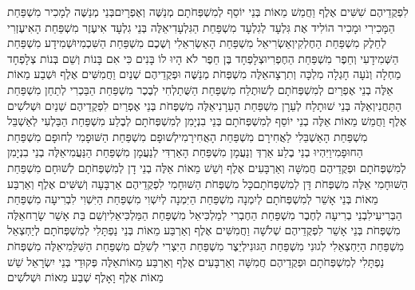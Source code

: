 \documentclass[../main/main.tex]{subfiles}
\begin{document}
\begin{multicols}{\ncols}
לִפְקֻדֵיהֶם שִׁשִּׁים אֶלֶף וַחֲמֵשׁ מֵאוֹת \ClosedSection{}בְּנֵי יוֹסֵף לְמִשְׁפְּחֹתָם מְנַשֶּׁה וְאֶפְרָיִם\PreVerseSpace{}בְּנֵי מְנַשֶּׁה לְמָכִיר מִשְׁפַּחַת הַמָּכִירִי וּמָכִיר הוֹלִיד אֶת גִּלְעָד לְגִלְעָד מִשְׁפַּחַת הַגִּלְעָדִי\PreVerseSpace{}אֵלֶּה בְּנֵי גִלְעָד אִיעֶזֶר מִשְׁפַּחַת הָאִיעֶזְרִי לְחֵלֶק מִשְׁפַּחַת הַחֶלְקִי\PreVerseSpace{}וְאַשְׂרִיאֵל מִשְׁפַּחַת הָאַשְׂרִאֵלִי וְשֶׁכֶם מִשְׁפַּחַת הַשִּׁכְמִי\PreVerseSpace{}וּשְׁמִידָע מִשְׁפַּחַת הַשְּׁמִידָעִי וְחֵפֶר מִשְׁפַּחַת הַחֶפְרִי\PreVerseSpace{}וּצְלָפְחָד בֶּן חֵפֶר לֹא הָיוּ לוֹ בָּנִים כִּי אִם בָּנוֹת וְשֵׁם בְּנוֹת צְלָפְחָד מַחְלָה וְנֹעָה חָגְלָה מִלְכָּה וְתִרְצָה\PreVerseSpace{}אֵלֶּה מִשְׁפְּחֹת מְנַשֶּׁה וּפְקֻדֵיהֶם שְׁנַיִם וַחֲמִשִּׁים אֶלֶף וּשְׁבַע מֵאוֹת \ClosedSection{}אֵלֶּה בְנֵי אֶפְרַיִם לְמִשְׁפְּחֹתָם לְשׁוּתֶלַח מִשְׁפַּחַת הַשֻּׁתַלְחִי לְבֶכֶר מִשְׁפַּחַת הַבַּכְרִי לְתַחַן מִשְׁפַּחַת הַתַּחֲנִי\PreVerseSpace{}וְאֵלֶּה בְּנֵי שׁוּתָלַח לְעֵרָן מִשְׁפַּחַת הָעֵרָנִי\PreVerseSpace{}אֵלֶּה מִשְׁפְּחֹת בְּנֵי אֶפְרַיִם לִפְקֻדֵיהֶם שְׁנַיִם וּשְׁלֹשִׁים אֶלֶף וַחֲמֵשׁ מֵאוֹת אֵלֶּה בְנֵי יוֹסֵף לְמִשְׁפְּחֹתָם \ClosedSection{}בְּנֵי בִנְיָמִן לְמִשְׁפְּחֹתָם לְבֶלַע מִשְׁפַּחַת הַבַּלְעִי לְאַשְׁבֵּל מִשְׁפַּחַת הָאַשְׁבֵּלִי לַאֲחִירָם מִשְׁפַּחַת הָאֲחִירָמִי\PreVerseSpace{}לְשׁוּפָם\SubEnd{} מִשְׁפַּחַת הַשּׁוּפָמִי לְחוּפָם מִשְׁפַּחַת הַחוּפָמִי\PreVerseSpace{}וַיִּהְיוּ בְנֵי בֶלַע אַרְדְּ וְנַעֲמָן מִשְׁפַּחַת הָאַרְדִּי לְנַעֲמָן מִשְׁפַּחַת הַנַּעֲמִי\PreVerseSpace{}אֵלֶּה בְנֵי בִנְיָמִן לְמִשְׁפְּחֹתָם וּפְקֻדֵיהֶם חֲמִשָּׁה וְאַרְבָּעִים אֶלֶף וְשֵׁשׁ מֵאוֹת \ClosedSection{}אֵלֶּה בְנֵי דָן לְמִשְׁפְּחֹתָם לְשׁוּחָם מִשְׁפַּחַת הַשּׁוּחָמִי אֵלֶּה מִשְׁפְּחֹת דָּן לְמִשְׁפְּחֹתָם\PreVerseSpace{}כָּל מִשְׁפְּחֹת הַשּׁוּחָמִי לִפְקֻדֵיהֶם אַרְבָּעָה וְשִׁשִּׁים אֶלֶף וְאַרְבַּע מֵאוֹת \ClosedSection{}בְּנֵי אָשֵׁר לְמִשְׁפְּחֹתָם לְיִמְנָה מִשְׁפַּחַת הַיִּמְנָה לְיִשְׁוִי מִשְׁפַּחַת הַיִּשְׁוִי לִבְרִיעָה מִשְׁפַּחַת הַבְּרִיעִי\PreVerseSpace{}לִבְנֵי בְרִיעָה לְחֶבֶר מִשְׁפַּחַת הַחֶבְרִי לְמַלְכִּיאֵל מִשְׁפַּחַת הַמַּלְכִּיאֵלִי\PreVerseSpace{}וְשֵׁם בַּת אָשֵׁר שָׂרַח\PreVerseSpace{}אֵלֶּה מִשְׁפְּחֹת בְּנֵי אָשֵׁר לִפְקֻדֵיהֶם שְׁלֹשָׁה וַחֲמִשִּׁים אֶלֶף וְאַרְבַּע מֵאוֹת \ClosedSection{}בְּנֵי נַפְתָּלִי לְמִשְׁפְּחֹתָם לְיַחְצְאֵל מִשְׁפַּחַת הַיַּחְצְאֵלִי לְגוּנִי מִשְׁפַּחַת הַגּוּנִי\PreVerseSpace{}לְיֵצֶר מִשְׁפַּחַת הַיִּצְרִי לְשִׁלֵּם מִשְׁפַּחַת הַשִּׁלֵּמִי\PreVerseSpace{}אֵלֶּה מִשְׁפְּחֹת נַפְתָּלִי לְמִשְׁפְּחֹתָם וּפְקֻדֵיהֶם חֲמִשָּׁה וְאַרְבָּעִים אֶלֶף וְאַרְבַּע מֵאוֹת\PreVerseSpace{}אֵלֶּה פְּקוּדֵי בְּנֵי יִשְׂרָאֵל שֵׁשׁ מֵאוֹת אֶלֶף וָאָלֶף שְׁבַע מֵאוֹת וּשְׁלֹשִׁים\OpenSection{}\par

\end{multicols}
\end{document}
